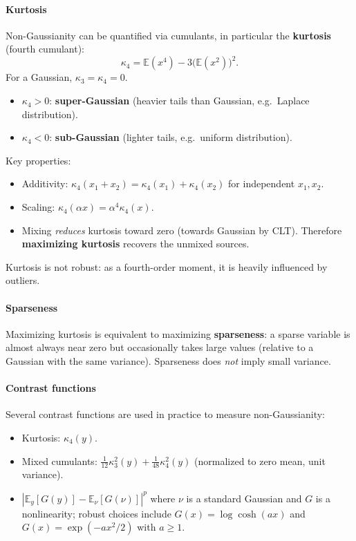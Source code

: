 \documentclass[11pt, oneside]{book}
\newcommand{\E}{\mathbb{E}}
\begin{document}
\paragraph{Kurtosis}
Non-Gaussianity can be quantified via cumulants, in particular the
\textbf{kurtosis} (fourth cumulant):
\[
  \kappa_4 = \E(x^4) - 3\bigl(\E(x^2)\bigr)^2.
\]
For a Gaussian, $\kappa_3 = \kappa_4 = 0$.
\begin{itemize}
  \item $\kappa_4 > 0$: \textbf{super-Gaussian} (heavier tails than Gaussian, e.g.\
        Laplace distribution).
  \item $\kappa_4 < 0$: \textbf{sub-Gaussian} (lighter tails, e.g.\ uniform distribution).
\end{itemize}
Key properties:
\begin{itemize}
  \item Additivity: $\kappa_4(x_1 + x_2) = \kappa_4(x_1) + \kappa_4(x_2)$ for
        independent $x_1, x_2$.
  \item Scaling: $\kappa_4(\alpha x) = \alpha^4 \kappa_4(x)$.
  \item Mixing \emph{reduces} kurtosis toward zero (towards Gaussian by CLT).
        Therefore \textbf{maximizing kurtosis} recovers the unmixed sources.
\end{itemize}
Kurtosis is not robust: as a fourth-order moment, it is heavily influenced by outliers.

\paragraph{Sparseness}
Maximizing kurtosis is equivalent to maximizing \textbf{sparseness}: a sparse variable
is almost always near zero but occasionally takes large values (relative to a Gaussian
with the same variance).
Sparseness does \emph{not} imply small variance.

\paragraph{Contrast functions}
Several contrast functions are used in practice to measure non-Gaussianity:
\begin{itemize}
  \item Kurtosis: $\kappa_4(y)$.
  \item Mixed cumulants: $\frac{1}{12}\kappa_3^2(y) + \frac{1}{48}\kappa_4^2(y)$
        (normalized to zero mean, unit variance).
  \item $\left|\E_y[G(y)] - \E_\nu[G(\nu)]\right|^p$ where $\nu$ is a standard Gaussian
        and $G$ is a nonlinearity; robust choices include
        $G(x) = \log\cosh(ax)$ and $G(x) = \exp(-ax^2/2)$ with $a \geq 1$.
\end{itemize}
\end{document}
